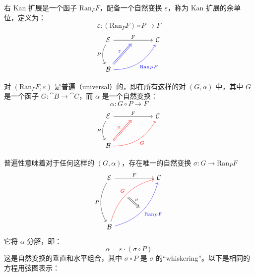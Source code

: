 \documentclass[DaoFP]{subfiles}
\begin{document}
右 Kan 扩展是一个函子 $\text{Ran}_P F$，配备一个自然变换 $\varepsilon$，称为 Kan 扩展的余单位，定义为：
\[ \varepsilon \colon (\text{Ran}_P F) \circ P \to F\]
\[
 \begin{tikzcd} [row sep=1cm, column sep=1cm]
 \cat E
 \arrow[rr, "F", "" {name=ID, below} ]
 \arrow[d, bend right, "P"']
 && \cat C
 \\
 \cat B
  \arrow[urr, blue, bend right, "\text{Ran}_P F"']
 \arrow[Rightarrow, blue, "\varepsilon",  to=ID]
 \end{tikzcd}
\]

对 $(\text{Ran}_P F, \varepsilon)$ 是普遍（universal）的，即在所有这样的对 $(G, \alpha)$ 中，其中 $G$ 是一个函子 $G \colon \cat B \to \cat C$，而 $\alpha$ 是一个自然变换：
\[ \alpha \colon G \circ P \to F \]
\[
 \begin{tikzcd} [row sep=1cm, column sep=1cm]
 \cat E
 \arrow[rr, "F", "" {name=ID, below} ]
 \arrow[d, bend right, "P"']
 && \cat C
 \\
 \cat B
  \arrow[urr, red, bend right, "G"']
 \arrow[Rightarrow, red, "\alpha",  to=ID]
 \end{tikzcd}
\]

普遍性意味着对于任何这样的 $(G, \alpha)$，存在唯一的自然变换 $\sigma \colon G \to \text{Ran}_P F$
\[
\begin{tikzcd}[row sep=2cm, column sep=2cm]
\cat E  \ar[d, bend right, "P"', "" {name=P}]
            \ar[r, "F", ""  {name=F, below, near start, bend right}]
&
\cat C
\\
\cat B
    \ar[ur, red, bend left, "G", "" {name=G, below}]
    \ar[ur, blue, bend right, "\text{Ran}_P F"', "" {name=Ran}]
\arrow[Rightarrow, "\sigma", from=G, to=Ran]
\end{tikzcd}
\]
它将 $\alpha$ 分解，即：
\[ \alpha = \varepsilon \cdot (\sigma \circ P) \]
这是自然变换的垂直和水平组合，其中 $\sigma \circ P$ 是 $\sigma$ 的“whiskering”。以下是相同的方程用弦图表示：
\end{document}
